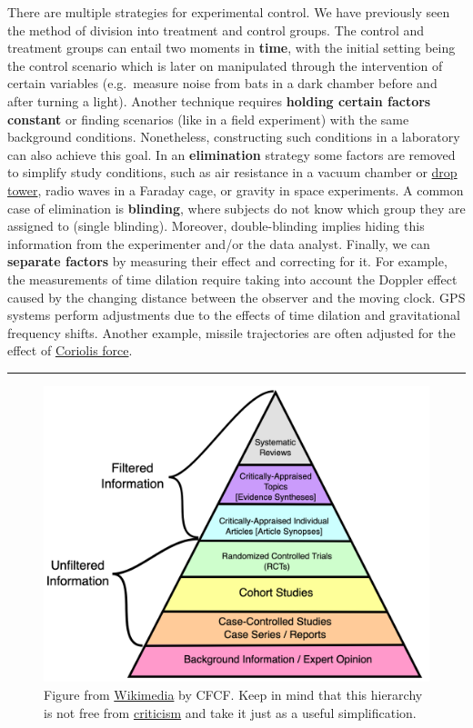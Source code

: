 \documentclass[
]{book}
\begin{document}
There are multiple strategies for experimental control. We have previously seen the method of division into treatment and control groups. The control and treatment groups can entail two moments in \textbf{time}, with the initial setting being the control scenario which is later on manipulated through the intervention of certain variables (e.g.~measure noise from bats in a dark chamber before and after turning a light). Another technique requires \textbf{holding certain factors constant} or finding scenarios (like in a field experiment) with the same background conditions. Nonetheless, constructing such conditions in a laboratory can also achieve this goal. In an \textbf{elimination} strategy some factors are removed to simplify study conditions, such as air resistance in a vacuum chamber or \href{https://en.wikipedia.org/wiki/Drop_tube}{drop tower}, radio waves in a Faraday cage, or gravity in space experiments. A common case of elimination is \textbf{blinding}, where subjects do not know which group they are assigned to (single blinding). Moreover, double-blinding implies hiding this information from the experimenter and/or the data analyst. Finally, we can \textbf{separate factors} by measuring their effect and correcting for it. For example, the measurements of time dilation require taking into account the Doppler effect caused by the changing distance between the observer and the moving clock. GPS systems perform adjustments due to the effects of time dilation and gravitational frequency shifts. Another example, missile trajectories are often adjusted for the effect of \href{https://en.wikipedia.org/wiki/Coriolis_force}{Coriolis force}.

\begin{center}\rule{0.5\linewidth}{0.5pt}\end{center}



\begin{figure}

{\centering \includegraphics[width=0.7\linewidth]{Figures/pyramid-evidence} 

}

\caption{Figure from \href{https://commons.wikimedia.org/wiki/File:Research_design_and_evidence_-_Capho.svg}{Wikimedia} by CFCF. Keep in mind that this hierarchy is not free from \href{https://en.wikipedia.org/wiki/Hierarchy_of_evidence\#Criticism}{criticism} and take it just as a useful simplification.}\label{fig:pyramid-eviodence}
\end{figure}
\end{document}

